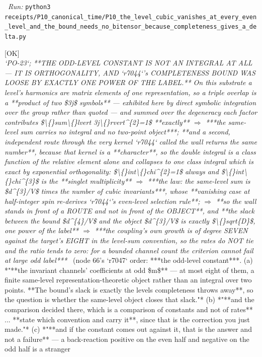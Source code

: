 \begin{description}
\ \emph{Run:} \texttt{python3 receipts/P10\_canonical\_time/P10\_the\_level\_cubic\_vanishes\_at\_every\_even\_level\_and\_the\_bound\_needs\_no\_bitensor\_because\_completeness\_gives\_a\_delta.py}
\item[\rcptlabel{P10_the_same_level_sum_is_orthogonality_rather_than_an_integral_and_the_completeness_bound_was_loose_by_one_power}{P10R60}\textbf{P10R60}\quad\texttt{P10\_the\_same\_level\_sum\_is\_orthogonality\_rather\_than\_an\_integral\_and\_the\_completeness\_bound\_was\_loose\_by\_one\_power}]\hfill\textsf{[OK]}\\
\textit{`PO-23`;  **THE ODD-LEVEL CONSTANT IS NOT AN INTEGRAL AT ALL --- IT IS ORTHOGONALITY, AND `r7044`'s COMPLETENESS BOUND WAS LOOSE BY EXACTLY ONE POWER OF THE LABEL.** On this substrate a level's harmonics are matrix elements of one representation, so a triple overlap is a **product of two \$3j\$ symbols** --- exhibited here by direct symbolic integration over the group rather than quoted --- and summed over the degeneracy each factor contributes \$\textbackslash\{\}sum\textbackslash\{\}lvert 3j\textbackslash\{\}rvert\textasciicircum{}\{2\}=1\$ **exactly** \ensuremath{\Rightarrow} ***the same-level sum carries no integral and no two-point object***;  **and a second, independent route through the very kernel `r7044` called the wall returns the same number**, because that kernel is a **character**, so the double integral is a class function of the relative element alone and collapses to one class integral which is exact by exponential orthogonality: \$\textbackslash\{\}int\textbackslash\{\}chi\textasciicircum{}\{2\}=1\$ always and \$\textbackslash\{\}int\textbackslash\{\}chi\textasciicircum{}\{3\}\$ is the **singlet multiplicity** \ensuremath{\Rightarrow} ***the law: the same-level sum is \$d\textasciicircum{}\{3\}/V\$ times the number of cubic invariants***, whose **vanishing case at half-integer spin re-derives `r7044`'s even-level selection rule**;  \ensuremath{\Rightarrow} **so the wall stands in front of a ROUTE and not in front of the OBJECT**, and  **the slack between the bound \$d\textasciicircum{}\{4\}/V\$ and the object \$d\textasciicircum{}\{3\}/V\$ is exactly \$\textbackslash\{\}sqrt\{D\}\$, one power of the label** \ensuremath{\Rightarrow} ***the coupling's own growth is of degree SEVEN against the target's EIGHT in the level-sum convention, so the rates do NOT tie and the ratio tends to zero: for a bounded channel count the criterion cannot fail at large odd label***} \ (node 66's `r7047` order: ***the odd-level constant***. (a) *"**the invariant channels' coefficients at odd \$m\$** --- at most eight of them, a finite same-level representation-theoretic object rather than an integral over two points.  **The bound's slack is exactly the levels completeness throws away**, so the question is whether the same-level object closes that slack."* (b) *"**and the comparison decided there, which is a comparison of constants and not of rates** ... **state which convention and carry it**, since that is the correction you just made."* (c) *"**and if the constant comes out against it, that is the answer and not a failure** --- a back-reaction positive on the even half and negative on the odd half is a stranger 
\end{description}

